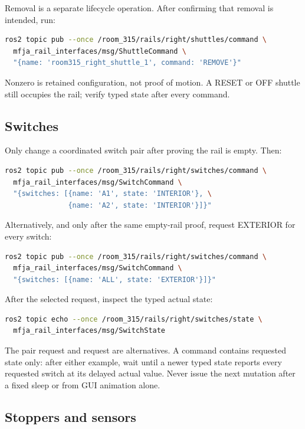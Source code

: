 Removal is a separate lifecycle operation. After confirming that removal is
intended, run:

\begin{lstlisting}[language=bash]
ros2 topic pub --once /room_315/rails/right/shuttles/command \
  mfja_rail_interfaces/msg/ShuttleCommand \
  "{name: 'room315_right_shuttle_1', command: 'REMOVE'}"
\end{lstlisting}

Nonzero  is retained configuration, not proof of motion. A RESET or
OFF shuttle still occupies the rail; verify typed state after every command.

\subsection{Switches}

Only change a coordinated switch pair after proving the rail is empty. Then:

\begin{lstlisting}[language=bash]
ros2 topic pub --once /room_315/rails/right/switches/command \
  mfja_rail_interfaces/msg/SwitchCommand \
  "{switches: [{name: 'A1', state: 'INTERIOR'}, \
               {name: 'A2', state: 'INTERIOR'}]}"
\end{lstlisting}

Alternatively, and only after the same empty-rail proof, request EXTERIOR for
every switch:

\begin{lstlisting}[language=bash]
ros2 topic pub --once /room_315/rails/right/switches/command \
  mfja_rail_interfaces/msg/SwitchCommand \
  "{switches: [{name: 'ALL', state: 'EXTERIOR'}]}"
\end{lstlisting}

After the selected request, inspect the typed actual state:

\begin{lstlisting}[language=bash]
ros2 topic echo --once /room_315/rails/right/switches/state \
  mfja_rail_interfaces/msg/SwitchState
\end{lstlisting}

The pair request and  request are alternatives. A command contains
requested state only: after either example, wait until a newer typed state
reports every requested switch at its delayed actual value. Never issue the
next mutation after a fixed sleep or from GUI animation alone.

\subsection{Stoppers and sensors}

